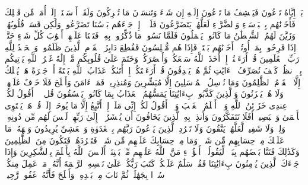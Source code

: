 \stopbuffer
\startbuffer[\q:6:41]
بَلۡ إِیَّاهُ تَدۡعُونَ فَیَكۡشِفُ مَا تَدۡعُونَ إِلَیۡهِ إِن شَاۤءَ وَتَنسَوۡنَ مَا تُشۡرِكُونَ%
\stopbuffer
\startbuffer[\q:6:42]
وَلَقَدۡ أَرۡسَلۡنَاۤ إِلَىٰۤ أُمَمࣲ مِّن قَبۡلِكَ فَأَخَذۡنَٰهُم بِٱلۡبَأۡسَاۤءِ وَٱلضَّرَّاۤءِ لَعَلَّهُمۡ یَتَضَرَّعُونَ%
\stopbuffer
\startbuffer[\q:6:43]
فَلَوۡلَاۤ إِذۡ جَاۤءَهُم بَأۡسُنَا تَضَرَّعُوا۟ وَلَٰكِن قَسَتۡ قُلُوبُهُمۡ وَزَیَّنَ لَهُمُ ٱلشَّیۡطَٰنُ مَا كَانُوا۟ یَعۡمَلُونَ%
\stopbuffer
\startbuffer[\q:6:44]
فَلَمَّا نَسُوا۟ مَا ذُكِّرُوا۟ بِهِۦ فَتَحۡنَا عَلَیۡهِمۡ أَبۡوَٰبَ كُلِّ شَیۡءٍ حَتَّىٰۤ إِذَا فَرِحُوا۟ بِمَاۤ أُوتُوۤا۟ أَخَذۡنَٰهُم بَغۡتَةࣰ فَإِذَا هُم مُّبۡلِسُونَ%
\stopbuffer
\startbuffer[\q:6:45]
فَقُطِعَ دَابِرُ ٱلۡقَوۡمِ ٱلَّذِینَ ظَلَمُوا۟ۚ وَٱلۡحَمۡدُ لِلَّهِ رَبِّ ٱلۡعَٰلَمِینَ%
\stopbuffer
\startbuffer[\q:6:46]
قُلۡ أَرَءَیۡتُمۡ إِنۡ أَخَذَ ٱللَّهُ سَمۡعَكُمۡ وَأَبۡصَٰرَكُمۡ وَخَتَمَ عَلَىٰ قُلُوبِكُم مَّنۡ إِلَٰهٌ غَیۡرُ ٱللَّهِ یَأۡتِیكُم بِهِۗ ٱنظُرۡ كَیۡفَ نُصَرِّفُ ٱلۡءَایَٰتِ ثُمَّ هُمۡ یَصۡدِفُونَ%
\stopbuffer
\startbuffer[\q:6:47]
قُلۡ أَرَءَیۡتَكُمۡ إِنۡ أَتَىٰكُمۡ عَذَابُ ٱللَّهِ بَغۡتَةً أَوۡ جَهۡرَةً هَلۡ یُهۡلَكُ إِلَّا ٱلۡقَوۡمُ ٱلظَّٰلِمُونَ%
\stopbuffer
\startbuffer[\q:6:48]
وَمَا نُرۡسِلُ ٱلۡمُرۡسَلِینَ إِلَّا مُبَشِّرِینَ وَمُنذِرِینَۖ فَمَنۡ ءَامَنَ وَأَصۡلَحَ فَلَا خَوۡفٌ عَلَیۡهِمۡ وَلَا هُمۡ یَحۡزَنُونَ%
\stopbuffer
\startbuffer[\q:6:49]
وَٱلَّذِینَ كَذَّبُوا۟ بِءَایَٰتِنَا یَمَسُّهُمُ ٱلۡعَذَابُ بِمَا كَانُوا۟ یَفۡسُقُونَ%
\stopbuffer
\startbuffer[\q:6:50]
قُل لَّاۤ أَقُولُ لَكُمۡ عِندِی خَزَاۤئِنُ ٱللَّهِ وَلَاۤ أَعۡلَمُ ٱلۡغَیۡبَ وَلَاۤ أَقُولُ لَكُمۡ إِنِّی مَلَكٌۖ إِنۡ أَتَّبِعُ إِلَّا مَا یُوحَىٰۤ إِلَیَّۚ قُلۡ هَلۡ یَسۡتَوِی ٱلۡأَعۡمَىٰ وَٱلۡبَصِیرُۚ أَفَلَا تَتَفَكَّرُونَ%
\stopbuffer
\startbuffer[\q:6:51]
وَأَنذِرۡ بِهِ ٱلَّذِینَ یَخَافُونَ أَن یُحۡشَرُوۤا۟ إِلَىٰ رَبِّهِمۡ لَیۡسَ لَهُم مِّن دُونِهِۦ وَلِیࣱّ وَلَا شَفِیعࣱ لَّعَلَّهُمۡ یَتَّقُونَ%
\stopbuffer
\startbuffer[\q:6:52]
وَلَا تَطۡرُدِ ٱلَّذِینَ یَدۡعُونَ رَبَّهُم بِٱلۡغَدَوٰةِ وَٱلۡعَشِیِّ یُرِیدُونَ وَجۡهَهُۥۖ مَا عَلَیۡكَ مِنۡ حِسَابِهِم مِّن شَیۡءࣲ وَمَا مِنۡ حِسَابِكَ عَلَیۡهِم مِّن شَیۡءࣲ فَتَطۡرُدَهُمۡ فَتَكُونَ مِنَ ٱلظَّٰلِمِینَ%
\stopbuffer
\startbuffer[\q:6:53]
وَكَذَٰلِكَ فَتَنَّا بَعۡضَهُم بِبَعۡضࣲ لِّیَقُولُوۤا۟ أَهَٰۤؤُلَاۤءِ مَنَّ ٱللَّهُ عَلَیۡهِم مِّنۢ بَیۡنِنَاۤۗ أَلَیۡسَ ٱللَّهُ بِأَعۡلَمَ بِٱلشَّٰكِرِینَ%
\stopbuffer
\startbuffer[\q:6:54]
وَإِذَا جَاۤءَكَ ٱلَّذِینَ یُؤۡمِنُونَ بِءَایَٰتِنَا فَقُلۡ سَلَٰمٌ عَلَیۡكُمۡۖ كَتَبَ رَبُّكُمۡ عَلَىٰ نَفۡسِهِ ٱلرَّحۡمَةَ أَنَّهُۥ مَنۡ عَمِلَ مِنكُمۡ سُوۤءَۢا بِجَهَٰلَةࣲ ثُمَّ تَابَ مِنۢ بَعۡدِهِۦ وَأَصۡلَحَ فَأَنَّهُۥ غَفُورࣱ رَّحِیمࣱ%
